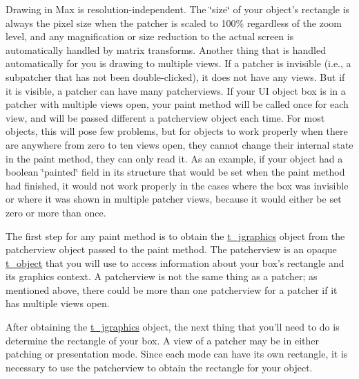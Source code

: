 Drawing in Max is resolution-\/independent. The \char`\"{}size\char`\"{} of your object's rectangle is always the pixel size when the patcher is scaled to 100\% regardless of the zoom level, and any magnification or size reduction to the actual screen is automatically handled by matrix transforms. Another thing that is handled automatically for you is drawing to multiple views. If a patcher is invisible (i.e., a subpatcher that has not been double-\/clicked), it does not have any views. But if it is visible, a patcher can have many patcherviews. If your UI object box is in a patcher with multiple views open, your paint method will be called once for each view, and will be passed different a patcherview object each time. For most objects, this will pose few problems, but for objects to work properly when there are anywhere from zero to ten views open, they cannot change their internal state in the paint method, they can only read it. As an example, if your object had a boolean \char`\"{}painted\char`\"{} field in its structure that would be set when the paint method had finished, it would not work properly in the cases where the box was invisible or where it was shown in multiple patcher views, because it would either be set zero or more than once.

The first step for any paint method is to obtain the \hyperlink{group__jgraphics_ga4bf27bd7e21a59a427481b909d4656e7}{t\_\-jgraphics} object from the patcherview object passed to the paint method. The patcherview is an opaque \hyperlink{structt__object}{t\_\-object} that you will use to access information about your box's rectangle and its graphics context. A patcherview is not the same thing as a patcher; as mentioned above, there could be more than one patcherview for a patcher if it has multiple views open.


\begin{DoxyCode}
    void uisimp_paint(t_uisimp *x, t_object *patcherview)
    {
        t_rect rect;

        t_jgraphics *g = (t_jgraphics*) patcherview_get_jgraphics(patcherview);     /
      / obtain graphics context
\end{DoxyCode}


After obtaining the \hyperlink{group__jgraphics_ga4bf27bd7e21a59a427481b909d4656e7}{t\_\-jgraphics} object, the next thing that you'll need to do is determine the rectangle of your box. A view of a patcher may be in either patching or presentation mode. Since each mode can have its own rectangle, it is necessary to use the patcherview to obtain the rectangle for your object.


